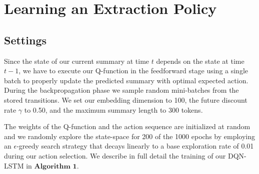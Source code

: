 \documentclass[12pt]{article}
\begin{document}
\section{Learning an Extraction Policy}
\subsection{Settings}
Since the state of our current summary at time $t$ depends on the state at time $t - 1$, we have to execute our Q-function in the feedforward stage using a single batch to properly update the predicted summary with optimal expected action. During the backpropagation phase we sample random mini-batches from the stored transitions.  We set our embedding dimension to 100, the future discount rate $\gamma$ to 0.50, and the maximum summary length to 300 tokens.

The weights of the Q-function and the action sequence are initialized at random and we randomly explore the state-space for 200 of the 1000 epochs by employing an $\epsilon$-greedy search strategy that decays linearly to a base exploration rate of 0.01 during our action selection. We describe in full detail the training of our DQN-LSTM in $\textbf{Algorithm 1}$.
\end{document}
